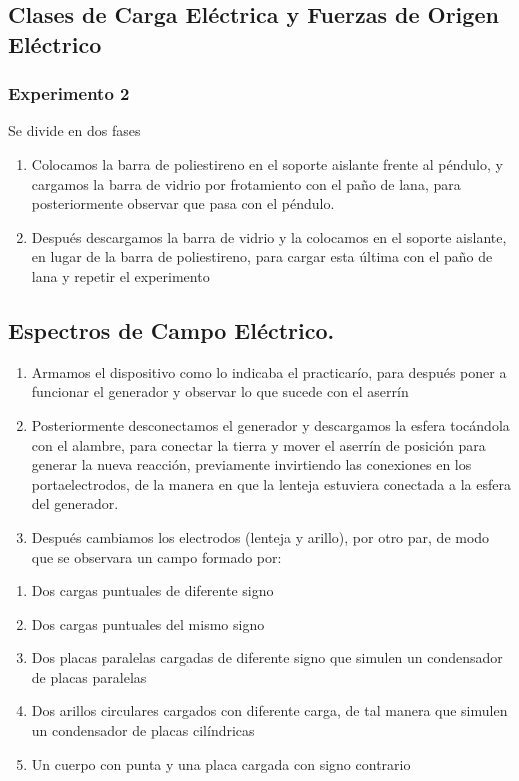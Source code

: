 \documentclass[10pt]{article}
\begin{document}
\begin{multicols}{2}
	\subsection{Clases de Carga Eléctrica y Fuerzas de Origen Eléctrico}
	\subsubsection{Experimento 2}
	Se divide en dos fases
	\begin{enumerate}
		\item Colocamos la barra de poliestireno en el soporte aislante frente al péndulo, y cargamos la barra de vidrio por frotamiento con el paño de lana, para posteriormente observar que pasa con el péndulo.
		\item Después descargamos la barra de vidrio y la colocamos en el soporte aislante, en lugar de la barra de poliestireno, para cargar esta última con el paño de lana y repetir el experimento
	\end{enumerate}
	\subsection{Espectros de Campo Eléctrico.}
	\begin{enumerate}
		\item Armamos el dispositivo como lo indicaba el practicarío, para después poner a funcionar el generador y observar lo que sucede con el aserrín
		\item Posteriormente desconectamos el generador y descargamos la esfera tocándola con el alambre, para conectar la tierra y mover el aserrín de posición para generar la nueva reacción, previamente invirtiendo las conexiones en los portaelectrodos, de la manera en que la lenteja estuviera conectada a la esfera del generador.
		\item Después cambiamos los electrodos (lenteja y arillo), por otro par, de modo que se observara un campo formado por:
	\end{enumerate}

	\begin{enumerate}[label=\alph*)]
		\item Dos cargas puntuales de diferente signo
		\item Dos cargas puntuales del mismo signo
		\item Dos placas paralelas cargadas de diferente signo que simulen un condensador de placas paralelas
		\item Dos arillos circulares cargados con diferente carga, de tal manera que simulen un condensador de placas cilíndricas
		\item Un cuerpo con punta y una placa cargada con signo contrario
	\end{enumerate}


\end{multicols}
\end{document}
